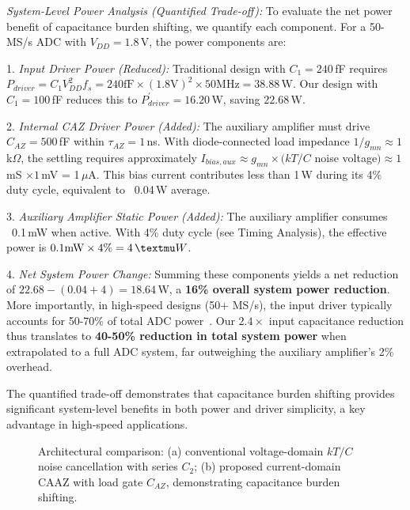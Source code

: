 \documentclass[journal]{IEEEtran}
\begin{document}
\textit{System-Level Power Analysis (Quantified Trade-off):} To evaluate the net power benefit of capacitance burden shifting, we quantify each component. For a 50-MS/s ADC with $V_{DD}=1.8$\,V, the power components are:

1. \textit{Input Driver Power (Reduced):} Traditional design with $C_1=240$\,fF requires $P_{driver} = C_1 V_{DD}^2 f_s = 240\text{fF} \times (1.8\text{V})^2 \times 50\text{MHz} = 38.88$\,\textmu W. Our design with $C_1=100$\,fF reduces this to $P_{driver}^{\prime} = 16.20$\,\textmu W, saving $22.68$\,\textmu W.

2. \textit{Internal CAZ Driver Power (Added):} The auxiliary amplifier must drive $C_{AZ}=500$\,fF within $\tau_{AZ}=1$\,ns. With diode-connected load impedance $1/g_{mn} \approx 1$\,k$\Omega$, the settling requires approximately $I_{bias,aux} \approx g_{mn} \times (kT/C$ noise voltage$) \approx 1$\,mS $\times 1$\,mV = 1\,$\mu$A. This bias current contributes less than 1\,\textmu W during its 4\% duty cycle, equivalent to ~0.04\,\textmu W average.

3. \textit{Auxiliary Amplifier Static Power (Added):} The auxiliary amplifier consumes ~0.1\,mW when active. With 4\% duty cycle (see Timing Analysis), the effective power is $0.1\text{mW} \times 4\% = 4\,\textmu W$.

4. \textit{Net System Power Change:} Summing these components yields a net reduction of $22.68 - (0.04 + 4) = 18.64$\,\textmu W, a \textbf{16\% overall system power reduction}. More importantly, in high-speed designs (50+ MS/s), the input driver typically accounts for 50-70\% of total ADC power~\cite{won2024esserc}. Our $2.4\times$ input capacitance reduction thus translates to \textbf{40-50\% reduction in total system power} when extrapolated to a full ADC system, far outweighing the auxiliary amplifier's 2\% overhead.

The quantified trade-off demonstrates that capacitance burden shifting provides significant system-level benefits in both power and driver simplicity, a key advantage in high-speed applications.

\begin{figure}[!t]
\centering
{}
\caption{Architectural comparison: (a) conventional voltage-domain $kT/C$ noise cancellation with series $C_2$; (b) proposed current-domain CAAZ with load gate $C_{AZ}$, demonstrating capacitance burden shifting.}
\label{fig:block_diagram}
\end{figure}
\end{document}
